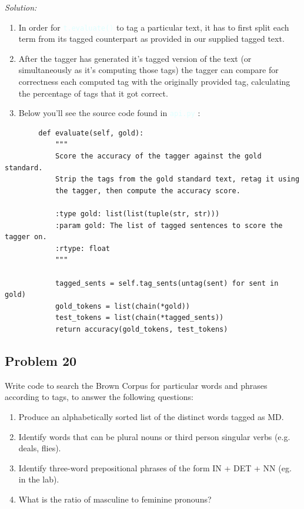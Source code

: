 \documentclass[11pt]{article}
\newenvironment{solution}{
	\vspace{10px}\noindent\emph{Solution:}
}{
	\vspace{10px}
}
\newcommand{\codeword}[1]{
	\texttt{\textcolor{lightCyan}{#1}}
}
\begin{document}
\begin{solution}
	
	\begin{enumerate}
		
		\item In order for \codeword{t.evaluate()} to tag a particular text, it has to first split each term from its tagged counterpart as provided in our supplied tagged text.
		
		\item After the tagger has generated it's tagged version of the text (or simultaneously as it's computing those tags) the tagger can compare for correctness each computed tag with the originally provided tag, calculating the percentage of tags that it got correct.
		
		\item Below you'll see the source code found in \codeword{api.py}:
		
	\end{enumerate}	
	
	\begin{lstlisting}
		def evaluate(self, gold):
			"""
			Score the accuracy of the tagger against the gold standard.
			Strip the tags from the gold standard text, retag it using
			the tagger, then compute the accuracy score.
			
			:type gold: list(list(tuple(str, str)))
			:param gold: The list of tagged sentences to score the tagger on.
			:rtype: float
			"""
			
			tagged_sents = self.tag_sents(untag(sent) for sent in gold)
			gold_tokens = list(chain(*gold))
			test_tokens = list(chain(*tagged_sents))
			return accuracy(gold_tokens, test_tokens)
	\end{lstlisting}

\end{solution} 


\newpage
\subsection*{Problem 20}

Write code to search the Brown Corpus for particular words and phrases according to tags, to answer the following questions:

\begin{enumerate}

	\item Produce an alphabetically sorted list of the distinct words tagged as MD.
	
	\item Identify words that can be plural nouns or third person singular verbs (e.g. deals, flies).
	
	\item Identify three-word prepositional phrases of the form IN + DET + NN (eg. in the lab).
	
	\item What is the ratio of masculine to feminine pronouns?

\end{enumerate}
\end{document}
